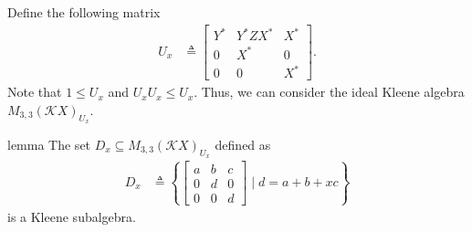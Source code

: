 \documentclass[a4paper,UKenglish,cleveref, autoref, thm-restate]{lipics-v2021}
\begin{document}
Define the following matrix
\begin{align*}
  U_x &  \triangleq 
        \begin{bmatrix}
          Y^* & Y^*ZX^* & X^* \\
          0   & X^* & 0 \\
          0   & 0   & X^*
        \end{bmatrix}.
\end{align*}
Note that $1  \leq  U_x$ and $U_xU_x  \leq  U_x$.  Thus, we can consider the ideal Kleene
algebra $M_{3,3}(\mathcal{K}X)_{U_x}$.

\begin{theoremEnd}{lemma}
  The set $D_x  \subseteq  M_{3,3}(\mathcal{K}X)_{U_x}$ defined as
  \begin{align*}
    D_x
    &  \triangleq 
      \left\{
      \begin{bmatrix}
        a & b & c \\
        0 & d & 0 \\
        0 & 0 & d
      \end{bmatrix}
       \mid  d = a + b + xc \right\}
  \end{align*}
  is a Kleene subalgebra.
\end{theoremEnd}
\end{document}
